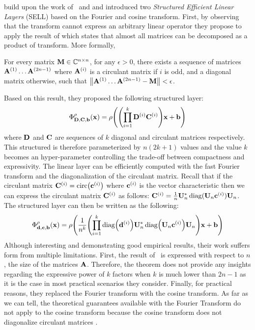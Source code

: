 \citet{moczulski2016acdc} build upon the work of~\citet{cheng2015exploration} and \citet{huhtanen2015factoring} and introduced two \emph{Structured Efficient Linear Layers} (SELL) based on the Fourier and cosine transform.
First, by observing that the \DC transform cannot express an arbitrary linear operator they propose to apply the result of \citet{huhtanen2015factoring} which states that almost all matrices can be decomposed as a product of \DC transform.
More formally, 
\begin{theorem}
  For every matrix $\mathbf{M} \in \mathbb{C}^{n \times n}$, for any $\epsilon > 0$, there exists a sequence of matrices $\mathbf{A}^{(1)} \ldots \mathbf{A}^{(2n-1)}$ where $\mathbf{A}^{(i)}$ is a circulant matrix if $i$ is odd, and a diagonal matrix otherwise, such that $\norm{\mathbf{A}^{(1)} \ldots \mathbf{A}^{(2n-1)} - \mathbf{M}} < \epsilon$.
  \label{theorem:ch3-huhtanen}
\end{theorem}
\noindent
Based on this result, they proposed the following structured layer:
\begin{equation}
  \Phi^\rho_{\Dmat, \Cmat, \bvec} (\xvec) = \rho \left( \left(\prod_{i = 1}^{k} \Dmat^{(i)} \Cmat^{(i)} \right) \xvec + \bvec \right)
\end{equation}
where $\mathbf{D}$ and $\mathbf{C}$ are sequences of $k$ diagonal and circulant matrices respectively.
This structured is therefore parameterized by $n(2k+1)$ values and the value $k$ becomes an hyper-parameter controlling the trade-off between compactness and expressivity. 
The linear layer can be efficiently computed with the fast Fourier transform and the diagonalization of the circulant matrix. 
Recall that if the circulant matrix $\Cmat^{(i)} =  \circulant\left(\cvec^{(i)}\right)$ where $\mathbf{c}^{(i)}$ is the vector characteristic then we can express the circulant matrix $\mathbf{C}^{(i)}$ as follows: $\mathbf{C}^{(i)} = \frac{1}{n} \mathbf{U}_n^* \operatorname*{diag}(\mathbf{U}_n \mathbf{c}^{(i)}) \mathbf{U}_n$.
The structured layer can then be written as the following:
\begin{equation}
  \Phi^\rho_{\dvec, \cvec, \bvec} (\xvec) = \rho \left(\frac{1}{n^k} \left(\prod_{i = 1}^{k} \diag\left(\dvec^{(i)}\right) \Umat_n^* \diag\left(\Umat_n \cvec^{(i)}\right) \Umat_n \right) \xvec + \bvec \right)
\end{equation}
\noindent
Although interesting and demonstrating good empirical results, their work suffers form from multiple limitations. 
First, the result of~\citet{huhtanen2015factoring} is expressed with respect to $n$, the size of the matrices $\mathbf{A}$.
Therefore, the theorem does not provide any insights regarding the expressive power of $k$ factors when $k$ is much lower than $2n-1$ as it is the case in most practical scenarios they consider.
Finally, for practical reasons, they replaced the Fourier transform with the cosine transform.
As far as we can tell, the theoretical guarantees available with the Fourier Transform do not apply to the cosine transform because the cosine transform does not diagonalize circulant matrices \cite{sanchez1995diagonalizing}.



